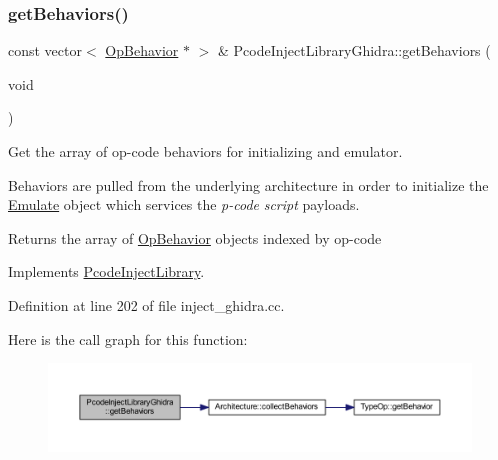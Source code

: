 \subsubsection{\texorpdfstring{getBehaviors()}{getBehaviors()}}
{\footnotesize\ttfamily const vector$<$ \mbox{\hyperlink{class_op_behavior}{Op\+Behavior}} $\ast$ $>$ \& Pcode\+Inject\+Library\+Ghidra\+::get\+Behaviors (\begin{DoxyParamCaption}\item[{void}]{ }\end{DoxyParamCaption})\hspace{0.3cm}{\ttfamily [virtual]}}



Get the array of op-\/code behaviors for initializing and emulator. 

Behaviors are pulled from the underlying architecture in order to initialize the \mbox{\hyperlink{class_emulate}{Emulate}} object which services the {\itshape p-\/code} {\itshape script} payloads. \begin{DoxyReturn}{Returns}
the array of \mbox{\hyperlink{class_op_behavior}{Op\+Behavior}} objects indexed by op-\/code 
\end{DoxyReturn}


Implements \mbox{\hyperlink{class_pcode_inject_library_aa2c520dab5db72d968e383b56d1ea8f6}{Pcode\+Inject\+Library}}.



Definition at line 202 of file inject\+\_\+ghidra.\+cc.

Here is the call graph for this function\+:
\nopagebreak
\begin{figure}[H]
\begin{center}
\leavevmode
\includegraphics[width=350pt]{class_pcode_inject_library_ghidra_a1195225ccb9918e6ca0b62d9a932b66f_cgraph}
\end{center}
\end{figure}
\mbox{\label{class_pcode_inject_library_ghidra_a59bd920e9392308e571f2e18b30537a6}} 
